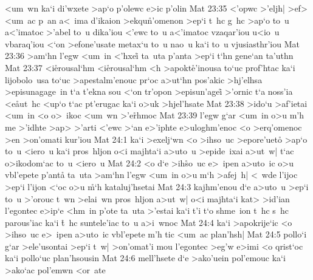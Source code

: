 <um~wn
ka`i
di'wxete
>ap`o
p'olewc
e>ic
p'olin\bibvsend
\vs Mat 23:35
<'opwc
>'eljh|
>ef>
<um~ac
p~an
a<~ima
d'ikaion
>ekqu\r{n}'omenon
>ep`i
t~hc
g~hc
>ap`o
to~u
a<'imatoc
>'abel
to~u
dika'iou
<'ewc
to~u
a<'imatoc
vzaqar'iou
u<io~u
vbaraq'iou
<`on
>efone'usate
metax`u
to~u
nao~u
ka`i
to~u
vjusiasthr'iou\bibvsend
\vs Mat 23:36
>am`hn
l'egw
<um~in
<'hxei\r{}
ta~uta
p'anta
>ep`i
t`hn
gene`an
ta'uthn\bibvsend
\vs Mat 23:37
<i\r{e}rousal`hm
<i\r{e}rousal`hm
<h
>apokt\r{e}'inousa
to`uc
prof'htac
ka`i
lijobolo~usa
to`uc
>apestalm'enouc
pr`oc
a>ut`hn
pos'akic
>hj'elhsa
>episunagage~in
t`a
t'ekna
sou
<`on
tr'opon
>episun'agei\r{}
>'ornic
t`a
noss'ia
<e\r{a}ut~hc
<up`o
t`ac
pt'erugac
ka`i
o>uk
>hjel'hsate\bibvsend
\vs Mat 23:38
>ido`u
>af'ietai
<um~in
<o
o>~ikoc
<um~wn
>'e\r{r}hmoc\bibvsend
{}
\vs Mat 23:39
l'egw
g`ar
<um~in
o>u
m'h
me
>'idhte
>ap>
>'arti
<'ewc
>`an
e>'iphte
e>uloghm'enoc
<o
>erq'omenoc
>en
>on'omati
kur'iou\bibvsend
\vs Mat 24:1
ka`i
>exelj`wn
<o
>ihso~uc
>epore'ueto\r{}
>ap`o
to~u
<iero~u
ka`i
pros~hljon
o<i
majhta`i
a>uto~u
>epide~ixai
a>ut~w|
t`ac
o>ikodom`ac
to~u
<iero~u\bibvsend
\vs Mat 24:2
<o
d`e
>ih\r{s}o~uc
e>~ipen
a>uto~ic
o>u
vbl'epete
p'anta\r{}
ta~uta
>am`hn
l'egw
<um~in
o>u
m`h
>afej~h|
<~wde
l'ijoc
>ep`i
l'ijon
<`oc
o>u
\r{m}`h
kataluj'hsetai\bibvsend
\vs Mat 24:3
kajhm'enou
d`e
a>uto~u
>ep`i
to~u
>'orouc
t~wn
>elai~wn
pros~hljon
a>ut~w|
o<i
majhta`i
kat>
>id'ian
l'egontec
e>ip`e
<hm~in
p'ote
ta~uta
>'estai
ka`i
t'i
t`o
shme~ion
t~hc
s~hc
parous'iac
ka`i
\r{t}~hc
suntele'iac
to~u
a>i~wnoc\bibvsend
\vs Mat 24:4
ka`i
>apokrije`ic
<o
>ihso~uc
e>~ipen
a>uto~ic
vbl'epete
m'h
tic
<um~ac
plan'hsh|\bibvsend
\vs Mat 24:5
pollo`i
g`ar
>ele'usontai
>ep`i
t~w|
>on'omat'i
mou
l'egontec
>eg'w
e>imi
<o
qrist`oc
ka`i
pollo`uc
plan'hsousin\bibvsend
\vs Mat 24:6
mell'hsete
d`e
>ako'uein
pol'emouc
ka`i
>ako`ac
pol'emwn
<or~ate
